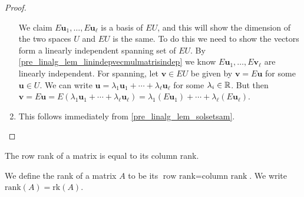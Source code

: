 \documentclass[10pt, a4paper]{article}
\newcommand{\mbf}[1]{\mathbf{#1}}
\begin{document}
\begin{proposition}
\begin{proof}
\begin{enumerate}[label = (\roman*)]
            We claim $E\mbf{u}_1, \dotsc, E\mbf{u}_{\ell}$ is a basis of $EU$,
            and this will show the dimension of the two spaces $U$ and $EU$ is the same.
            To do this we need to show the vectors form a linearly independent spanning set of $EU$.
            By \autoref{pre_linalg_lem_linindepvecmulmatrisindep} we know $E\mbf{u}_1, \dotsc, E\mbf{v}_{\ell}$ are linearly independent.
            For spanning,
            let $\mbf{v} \in EU$ be given by $\mbf{v} = E\mbf{u}$ for some $\mbf{u} \in U$.
            We can write $\mbf{u} = \lambda_1\mbf{u}_1 + \dotsi + \lambda_{\ell}\mbf{u}_{\ell}$ for some $\lambda_i \in \mathbb{R}$.
            But then $\mbf{v} = E\mbf{u} = E(\lambda_1\mbf{u}_1 + \dotsi + \lambda_{\ell}\mbf{u}_{\ell}) = \lambda_1(E\mbf{u}_1) + \dotsi + \lambda_{\ell}(E\mbf{u}_{\ell})$.
            \item This follows immediately from \autoref{pre_linalg_lem_solsetsam}.
        \end{enumerate}
    \end{proof}
\end{proposition}

\begin{theorem}\label{pre_linalg_thm_ranktheorem}
    The row rank of a matrix is equal to its column rank.
\end{theorem}

\begin{definition}[Rank]
    We define the rank of a matrix $A$ to be its $\text{row rank} = \text{column rank}$.
    We write $\mathrm{rank}(A) = \mathrm{rk}(A)$.
\end{definition}
\end{document}
